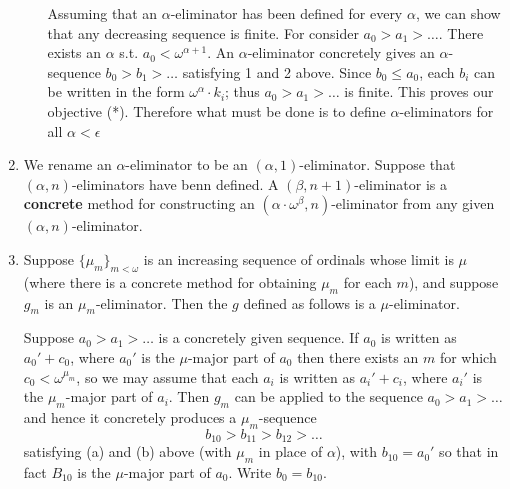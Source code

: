 \documentclass[11pt]{article}
\begin{document}
\begin{enumerate}
\begin{enumerate}
Assuming that an \(\alpha\)-eliminator has been defined for every \(\alpha\), we can show that any
decreasing sequence is finite. For consider \(a_0>a_1>\dots\). There exists an \(\alpha\)
s.t. \(a_0<\omega^{\alpha+1}\). An \(\alpha\)-eliminator concretely gives
an \(\alpha\)-sequence \(b_0>b_1>\dots\) satisfying 1 and 2 above. Since \(b_0\le a_0\),
each \(b_i\) can be written in the form \(\omega^\alpha\cdot k_i\); thus \(a_0>a_1>\dots\) is
finite. This proves our objective (*). Therefore what must be done is to
define \(\alpha\)-eliminators for all \(\alpha<\epsilon\)
\end{enumerate}
\item We rename an \(\alpha\)-eliminator to be an \((\alpha,1)\)-eliminator. Suppose
that \((\alpha,n)\)-eliminators have benn defined. A \((\beta,n+1)\)-eliminator is a \textbf{concrete} method
for constructing an \((\alpha\cdot\omega^\beta,n)\)-eliminator from any given \((\alpha,n)\)-eliminator.
\item Suppose \(\{\mu_m\}_{m<\omega}\) is an increasing sequence of ordinals whose limit is \(\mu\) (where
there is a concrete method for obtaining \(\mu_m\) for each \(m\)), and suppose \(g_m\) is
an \(\mu_m\)-eliminator. Then the \(g\) defined as follows is a \(\mu\)-eliminator.

Suppose \(a_0>a_1>\dots\) is a concretely given sequence. If \(a_0\) is written
as \(a_0'+c_0\), where \(a_0'\) is the \(\mu\)-major part of \(a_0\) then there exists
an \(m\) for which \(c_0<\omega^{\mu_m}\), so we may assume that each \(a_i\) is written
as \(a_i'+c_i\), where \(a_i'\) is the \(\mu_m\)-major part of \(a_i\). Then \(g_m\) can be
applied to the sequence \(a_0>a_1>\dots\) and hence it concretely produces
a \(\mu_m\)-sequence
   \begin{equation}
\label{eq:2.11.1}
b_{10}>b_{11}>b_{12}>\dots
   \end{equation}
satisfying (a) and (b) above (with \(\mu_m\) in place of \(\alpha\)), with \(b_{10}=a_0'\) so that in
fact \(B_{10}\) is the \(\mu\)-major part of \(a_0\). Write \(b_0=b_{10}\).


\end{enumerate}
\end{document}
